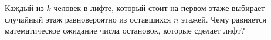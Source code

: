 Каждый из $k$ человек в лифте, который стоит на первом этаже выбирает случайный этаж равновероятно из
оставшихся $n$ этажей. Чему равняется математическое ожидание числа остановок, которые сделает лифт?

